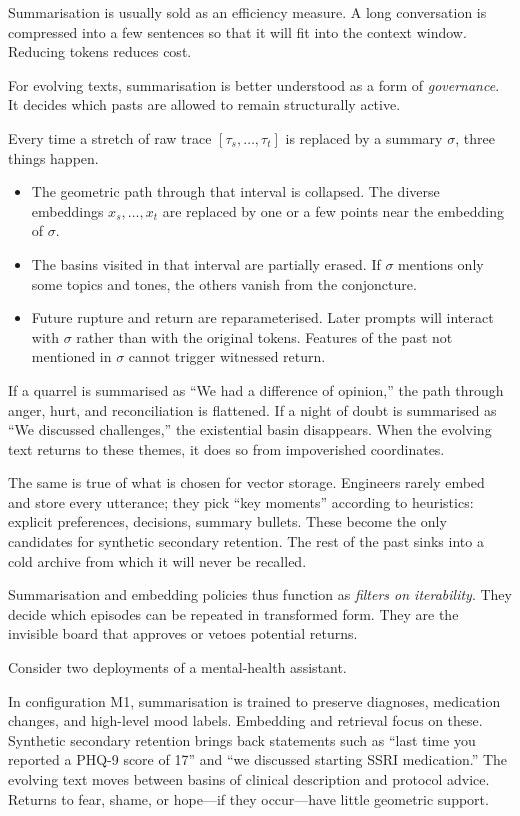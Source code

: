 \documentclass[12pt,a4paper]{article}
\begin{document}
Summarisation is usually sold as an efficiency measure. A long conversation is compressed into a few sentences so that it will fit into the context window. Reducing tokens reduces cost.

For evolving texts, summarisation is better understood as a form of \emph{governance}. It decides which pasts are allowed to remain structurally active.

Every time a stretch of raw trace $[\tau_s, \dots, \tau_t]$ is replaced by a summary $\sigma$, three things happen.

\begin{itemize}
  \item The geometric path through that interval is collapsed. The diverse embeddings $x_s, \dots, x_t$ are replaced by one or a few points near the embedding of $\sigma$.

  \item The basins visited in that interval are partially erased. If $\sigma$ mentions only some topics and tones, the others vanish from the conjoncture.

  \item Future rupture and return are reparameterised. Later prompts will interact with $\sigma$ rather than with the original tokens. Features of the past not mentioned in $\sigma$ cannot trigger witnessed return.
\end{itemize}

If a quarrel is summarised as ``We had a difference of opinion,'' the path through anger, hurt, and reconciliation is flattened. If a night of doubt is summarised as ``We discussed challenges,'' the existential basin disappears. When the evolving text returns to these themes, it does so from impoverished coordinates.

The same is true of what is chosen for vector storage. Engineers rarely embed and store every utterance; they pick ``key moments'' according to heuristics: explicit preferences, decisions, summary bullets. These become the only candidates for synthetic secondary retention. The rest of the past sinks into a cold archive from which it will never be recalled.

Summarisation and embedding policies thus function as \emph{filters on iterability}. They decide which episodes can be repeated in transformed form. They are the invisible board that approves or vetoes potential returns.

Consider two deployments of a mental-health assistant.

In configuration M1, summarisation is trained to preserve diagnoses, medication changes, and high-level mood labels. Embedding and retrieval focus on these. Synthetic secondary retention brings back statements such as ``last time you reported a PHQ-9 score of 17'' and ``we discussed starting SSRI medication.'' The evolving text moves between basins of clinical description and protocol advice. Returns to fear, shame, or hope---if they occur---have little geometric support.
\end{document}
